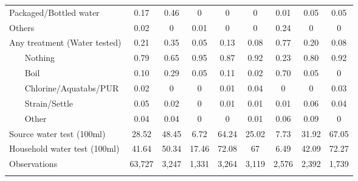 \begin{table}[htbp]
\begin{tabular}{l*{8}{c}}
Packaged/Bottled water&        0.17&        0.46&        0&        0&        0&        0.01&        0.05&        0.05\\
Others              &        0.02&        0&        0.01&        0&        0&        0.24&        0&        0\\
Any treatment (Water tested)&        0.21&        0.35&        0.05&        0.13&        0.08&        0.77&        0.20&        0.08\\
~~~ Nothing      &        0.79&        0.65&        0.95&        0.87&        0.92&        0.23&        0.80&        0.92\\
~~~ Boil         &        0.10&        0.29&        0.05&        0.11&        0.02&        0.70&        0.05&        0\\
~~~ Chlorine/Aquatabs/PUR&        0.02&        0&        0&        0.01&        0.04&        0&        0&        0.03\\
~~~ Strain/Settle&        0.05&        0.02&        0&        0.01&        0.01&        0.01&        0.06&        0.04\\
~~~ Other        &        0.04&        0.04&        0&        0&        0.01&        0.06&        0.09&        0\\
Source water test (100ml)&       28.52&       48.45&        6.72&       64.24&       25.02&        7.73&       31.92&       67.05\\
Household water test (100ml)&       41.64&       50.34&       17.46&       72.08&       67&        6.49&       42.09&       72.27\\
\hline
Observations        &      63,727&       3,247&       1,331&       3,264&       3,119&       2,576&       2,392&       1,739\\
\hline\hline
\multicolumn{9}{p{0.87\linewidth}}{\footnotesize }\\
\end{tabular}
\end{table}
